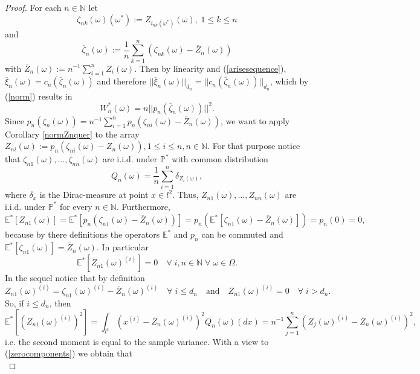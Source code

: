 \documentclass[10pt,a4paper]{amsart}
\begin{document}
\begin{proof} For each $n \in \mathbb{N}$ let $$\zeta_{nk}(\omega)(\omega^*):=Z_{i_{nk}(\omega^*)}(\omega), \; 1 \le k \le n$$ and
$$
\overline{\zeta}_n(\omega):= \frac{1}{n} \sum_{k=1}^n (\zeta_{nk}(\omega)- \overline{Z}_n(\omega))
$$
with $\overline{Z}_n(\omega):=n^{-1} \sum_{i=1}^n Z_i(\omega).$ Then by linearity and (\ref{arisesequence}), $\overline{\xi}_n(\omega) = c_n(\overline{\zeta}_n(\omega))$ and
therefore $||\overline{\xi}_n(\omega)||_{d_n}=||c_n(\overline{\zeta}_n(\omega))||_{d_n}$, which by (\ref{norm}) results in
$$
 W_n^*(\omega)=n||p_n(\overline{\zeta}_n(\omega))||^2.
$$
Since $p_n(\zeta_n(\omega))=n^{-1} \sum_{i=1}^n p_n(\zeta_{ni}(\omega)-\overline{Z}_n(\omega))$, we want to apply Corollary \ref{normZnquer} to
the array $Z_{ni}(\omega):= p_n(\zeta_{ni}(\omega)-\overline{Z}_n(\omega)), 1 \le i \le n, n \in \mathbb{N}.$ For that purpose notice that
$\zeta_{n1}(\omega),\ldots,\zeta_{nn}(\omega)$ are i.i.d. under $\mathbb{P}^*$ with common distribution
$$
 Q_n(\omega)=\frac{1}{n} \sum_{i=1}^n \delta_{Z_i(\omega)},
$$
where $\delta_x$ is the Dirac-measure at point $x \in l^2.$ Thus, $Z_{n1}(\omega),\ldots,Z_{nn}(\omega)$ are i.i.d. under $\mathbb{P}^*$ for every $n \in \mathbb{N}.$ Furthermore,
$$
 \mathbb{E}^*[Z_{n1}(\omega)]=\mathbb{E}^*[p_n(\zeta_{n1}(\omega)-\overline{Z}_n(\omega))]
 =p_n(\mathbb{E}^*[\zeta_{n1}(\omega)-\overline{Z}_n(\omega)])=p_n(0)=0,
$$
because by there definitions the operators $\mathbb{E}^*$ and $p_n$ can be commuted and $\mathbb{E}^*[\zeta_{n1}(\omega)]= \overline{Z}_n(\omega).$
In particular
\begin{equation} \label{Zn1arecentered}
\mathbb{E}^*[Z_{n1}(\omega)^{(i)}] = 0 \quad \forall \; i,n \in \mathbb{N} \; \forall \; \omega \in \Omega.
\end{equation}
In the sequel notice that by definition
\begin{equation} \label{zerocomponents}
   Z_{n1}(\omega)^{(i)} = \zeta_{n1}(\omega)^{(i)}-\overline{Z}_n(\omega)^{(i)} \quad \forall \; i \le d_n \quad \text{and} \quad                           Z_{n1}(\omega)^{(i)} =0 \quad \forall \; i >d_n.
\end{equation}
So, if $i \le d_n$, then
$$
 \mathbb{E}^*[(Z_{n1}(\omega)^{(i)})^2]=\int_{l^2} (x^{(i)}-\overline{Z}_n(\omega)^{(i)})^2 Q_n(\omega)(dx)= n^{-1} \sum_{j=1 }^n (Z_j(\omega)^{(i)}-\overline{Z}_n(\omega)^{(i)})^2,
$$
i.e. the second moment is equal to the sample variance. With a view to (\ref{zerocomponents}) we obtain that
\begin{equation} \label{Zn1secondmoments}

\end{equation}
\end{proof}
\end{document}
